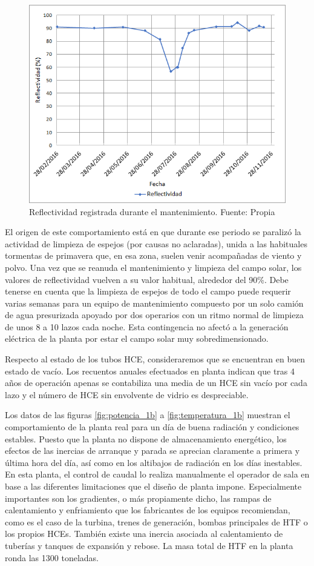 \begin{figure}[!h]
\includegraphics[width=0.9\linewidth]{images/reflectividad.png}
\caption{Reflectividad registrada durante el mantenimiento. Fuente: Propia} 
\label{fig:reflectividad}
\end{figure}

El origen de este comportamiento está en que durante ese periodo se paralizó la actividad de limpieza de espejos (por causas no aclaradas), unida a las habituales tormentas de primavera que, en esa zona, suelen venir acompañadas de viento y polvo. Una vez que se reanuda el mantenimiento y limpieza del campo solar, los valores de reflectividad vuelven a su valor habitual, alrededor del 90\%. Debe tenerse en cuenta que la limpieza de espejos de todo el campo puede requerir varias semanas para un equipo de mantenimiento compuesto por un solo camión de agua presurizada apoyado por dos operarios con un ritmo normal de limpieza de unos 8 a 10 lazos cada noche. Esta contingencia no afectó a la generación eléctrica de la planta por estar  el campo solar muy sobredimensionado.

Respecto al estado de los tubos HCE, consideraremos que se encuentran en buen estado de vacío. Los recuentos anuales efectuados en planta indican que tras 4 años de operación apenas se contabiliza una media de un HCE sin vacío por cada lazo y el número de HCE sin envolvente de vidrio es despreciable.

Los datos de las figuras \ref{fig:potencia_1b} a \ref{fig:temperatura_1b} muestran el comportamiento de la planta real para un día de buena radiación y condiciones estables. Puesto que la planta no dispone de almacenamiento energético, los efectos de las inercias de arranque y parada se aprecian claramente a primera y última hora del día, así como en los altibajos de radiación en los días inestables. En esta planta, el control de caudal lo realiza manualmente el operador de sala en base a las diferentes limitaciones que el diseño de planta impone. Especialmente importantes son los gradientes, o más propiamente dicho, las rampas de calentamiento y enfriamiento que los fabricantes de los equipos recomiendan, como es el caso de la turbina, trenes de generación, bombas principales de HTF o los propios HCEs. También existe una inercia asociada al calentamiento de tuberías y tanques de expansión y rebose.  La masa total de HTF en la planta ronda las 1300 toneladas. 

